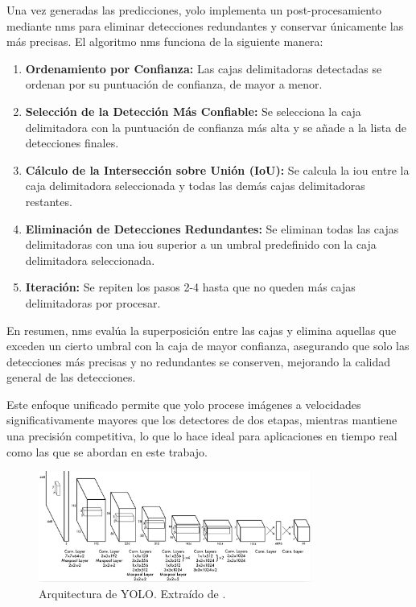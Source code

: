 \documentclass[11pt,spanish,listoffigures,listoftables]{tfgetsinf}
\begin{document}
Una vez generadas las predicciones, \gls{yolo} implementa un post-procesamiento mediante \gls{nms} para eliminar detecciones redundantes y conservar únicamente las más precisas. El algoritmo \gls{nms} funciona de la siguiente manera:

\begin{enumerate}
   \item \textbf{Ordenamiento por Confianza:} Las cajas delimitadoras detectadas se ordenan por su puntuación de confianza, de mayor a menor.
   \item \textbf{Selección de la Detección Más Confiable:} Se selecciona la caja delimitadora con la puntuación de confianza más alta y se añade a la lista de detecciones finales.
   \item \textbf{Cálculo de la Intersección sobre Unión (IoU):} Se calcula la \gls{iou} entre la caja delimitadora seleccionada y todas las demás cajas delimitadoras restantes.
   \item \textbf{Eliminación de Detecciones Redundantes:} Se eliminan todas las cajas delimitadoras con una \gls{iou} superior a un umbral predefinido con la caja delimitadora seleccionada.
   \item \textbf{Iteración:} Se repiten los pasos 2-4 hasta que no queden más cajas delimitadoras por procesar.
\end{enumerate}

En resumen, \gls{nms} evalúa la superposición entre las cajas y elimina aquellas que exceden un cierto umbral con la caja de mayor confianza, asegurando que solo las detecciones más precisas y no redundantes se conserven, mejorando la calidad general de las detecciones.

Este enfoque unificado permite que \gls{yolo} procese imágenes a velocidades significativamente mayores que los detectores de dos etapas, mientras mantiene una precisión competitiva, lo que lo hace ideal para aplicaciones en tiempo real como las que se abordan en este trabajo.

\begin{figure}[H]
   \centering
   \includegraphics[width=0.8\textwidth]{images/estado_del_arte/yolo_architecture.png}
   \caption[Arquitectura de YOLO]{Arquitectura de YOLO. Extraído de \cite[fig. 3, p. ~3]{redmon2016lookonceunifiedrealtime}.}
   \label{fig:yolo_architecture}
\end{figure}
\end{document}
